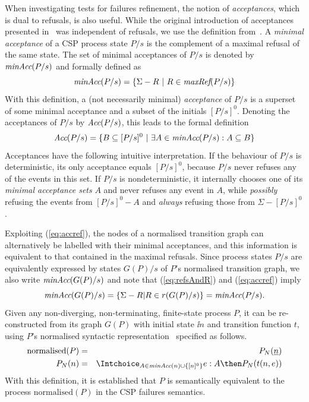 When investigating  tests for failures refinement, the notion of
\emph{acceptances}, which is dual to refusals, is also useful. While the
original introduction of acceptances presented
in~\cite[pp.~75]{Hennessy:1988:ATP:50497} was independent of refusals, we use
the definition from~\cite[pp.~278]{Roscoe:1997:TPC:550448}.   A \emph{minimal
acceptance} of a CSP process state $P/s$ is the complement of a maximal
refusal of the same state. The set of minimal acceptances of $P/s$ is denoted
by $\text{\it minAcc}(P/s)$ and formally defined as
%
\begin{equation}\label{eq:accref}
\text{\it minAcc}(P/s) = \{ \Sigma - R~|~R\in \text{\it maxRef}(P/s)  \}
\end{equation}
%
With this definition, a (not necessarily minimal) \emph{acceptance} of $P/s$ is a superset of some minimal acceptance and a subset of the initials $[P/s]^0$. Denoting the acceptances of $P/s$ by $\text{\it Acc}(P/s)$, this leads to the formal definition
\begin{equation}
\label{eq:accrefall}
\text{\it Acc}(P/s)  = \{ B\subseteq [P/s]^0~|~\exists A\in\text{\it minAcc}(P/s):  A \subseteq B   \}
\end{equation}
%
Acceptances have the following intuitive interpretation.  If the behaviour of
$P/s$ is deterministic, its only acceptance equals $[P/s]^0$, because $P/s$
never refuses any of the events in this set. If $P/s$ is nondeterministic, it
internally chooses one of its \emph{minimal acceptance sets} $A$ and never
refuses any event in $A$, while {\it possibly} refusing the events from
$[P/s]^0 - A$ and {\it always} refusing those from $\Sigma - [P/s]^0$.


Exploiting (\ref{eq:accref}),
the nodes of a normalised transition graph can
alternatively be labelled with their minimal acceptances, and this
information is equivalent to that contained in the maximal refusals. Since
process states $P/s$ are equivalently expressed by states $G(P)/s$ of $P$'s
normalised transition graph, we also write $\text{\it minAcc}(G(P)/s)$ and
note that (\ref{eq:refsAndR}) and (\ref{eq:accref}) imply
\begin{equation}\label{eq:maxrefsminaccs}
\text{\it minAcc}(G(P)/s) = \{ \Sigma - R | R\in r(G(P)/s) \} = \text{\it minAcc}(P/s).
\end{equation}
%
Given any non-diverging, non-terminating, finite-state process $P$, it can be
re-con\-struc\-ted from its graph $G(P)$ with initial state $\ii
n$ and transition function $t$, using $P$'s normalised syntactic
representation~\cite[pp.~277]{Roscoe:1997:TPC:550448} specified as follows.
\begin{eqnarray*}
\text{normalised}(P) & = & P_N(\ii n)
\\
P_N(n) & = & \Intchoice_{A\in\minaccs(n)\cup \{ [n]^0 \} } e:A\then P_N(t(n,e))
\end{eqnarray*}
With this definition, it is established that $P$ is semantically equivalent
to the process $\text{normalised}(P)$ in the CSP failures semantics.

